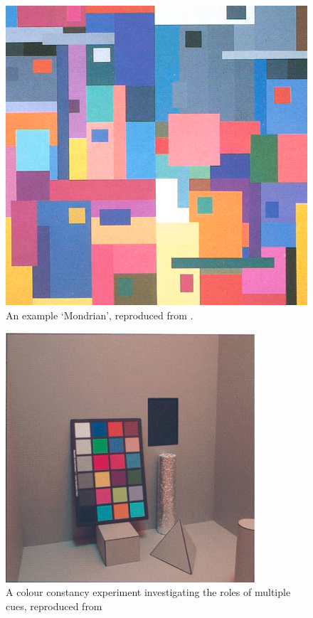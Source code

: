\begin{figure}[hbp]
\includegraphics[width=\textwidth]{figs/tablet/mondrian.png}
\caption{An example `Mondrian', reproduced from \citet{land_recent_1986}.}
\label{fig:mondrian}
\end{figure}

\begin{figure}[hbp]
\includegraphics[width=\textwidth]{figs/tablet/KraftBrainard.png}
\caption{A colour constancy experiment investigating the roles of multiple cues, reproduced from \citet{kraft_mechanisms_1999}}
\label{fig:KraftBrainard}
\end{figure}

